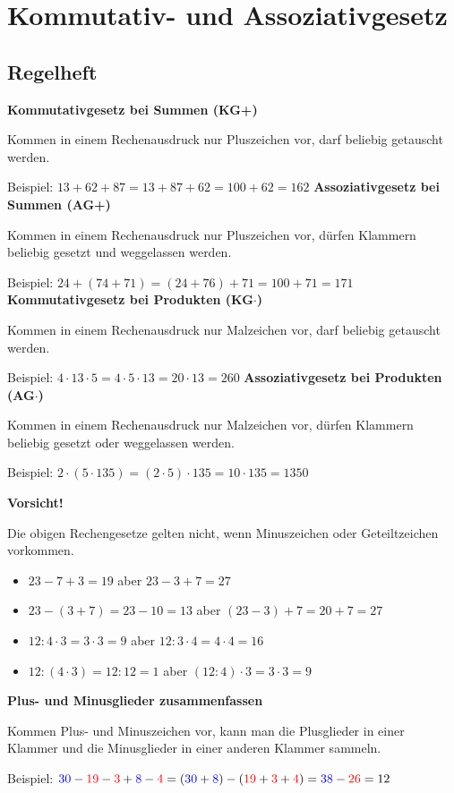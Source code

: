 \documentclass[parskip=half-,a4paper]{scrartcl} %
\newcommand{\red}[1]{{\color{red}#1}}
\newcommand{\blue}[1]{{\color{blue}#1}}
\begin{document}
\section{Kommutativ- und Assoziativgesetz}
\subsection{Regelheft}

\begin{tasks}
	\task \textbf{Kommutativgesetz bei Summen (KG+)}

	Kommen in einem Rechenausdruck nur Pluszeichen vor, darf beliebig getauscht
	werden.

	Beispiel: $13+62+87 = 13+87+62 = 100 + 62 = 162$
	\task \textbf{Assoziativgesetz bei Summen (AG+)}

	Kommen in einem Rechenausdruck nur Pluszeichen vor, dürfen Klammern beliebig
	gesetzt und weggelassen werden.

	Beispiel: $24+(74+71) = (24+76)+71 = 100 + 71 = 171$
	\task \textbf{Kommutativgesetz bei Produkten (KG$\cdot$)}

	Kommen in einem Rechenausdruck nur Malzeichen vor, darf beliebig getauscht
	werden.

	Beispiel: $4\cdot 13 \cdot 5= 4 \cdot 5 \cdot 13 = 20 \cdot 13 = 260$
	\task \textbf{Assoziativgesetz bei Produkten (AG$\cdot$)}

	Kommen in einem Rechenausdruck nur Malzeichen vor, dürfen Klammern beliebig
	gesetzt oder weggelassen werden.

	Beispiel: $2\cdot (5 \cdot 135)=(2\cdot 5)\cdot 135 = 10\cdot 135 =1350$
\end{tasks}

\textbf{\large Vorsicht!}

Die obigen Rechengesetze gelten nicht, wenn Minuszeichen oder Geteiltzeichen
vorkommen.
\begin{itemize}
	\item $23-7+3=19$ aber $23-3+7=27$
	\item $23-(3+7)=23-10=13$ aber $(23-3)+7=20+7=27$
	\item $12:4\cdot 3 = 3 \cdot 3 = 9$ aber $12 : 3 \cdot 4 = 4 \cdot 4 = 16$
	\item $12:(4 \cdot 3) = 12 : 12 = 1$ aber $(12:4)\cdot 3 = 3\cdot 3 = 9$
\end{itemize}

\begin{tasks}
	\task \textbf{Plus- und Minusglieder zusammenfassen}

		Kommen Plus- und Minuszeichen vor, kann man die Plusglieder in einer Klammer
		und die Minusglieder in einer anderen Klammer sammeln.

		Beispiel: $\blue{30}-\red{19}-\red{3}+\blue{8}-\red{4} =
		(\blue{30}+\blue{8})-(\red{19}+\red{3}+\red{4})= \blue{38}-\red{26}=12$
\end{tasks}
\end{document}
